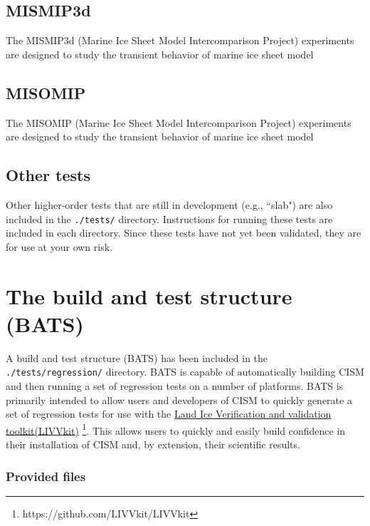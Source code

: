 \subsection{MISMIP3d}
\label{sc:mismip3d}
The MISMIP3d (Marine Ice Sheet Model Intercomparison Project) experiments \citep{Pattyn2013} are designed to study the transient behavior of marine ice sheet model 


\subsection{MISOMIP}
\label{sc:misomip}
The MISOMIP (Marine Ice Sheet Model Intercomparison Project) experiments \citep{AsayDavis2016} are designed to study the transient behavior of marine ice sheet model 


\subsection{Other tests}
Other higher-order tests that are still in development (e.g., ``slab") are also included in the \texttt{./tests/}
directory. Instructions for running these tests are included in each directory. Since these tests have not yet been validated, 
they are for use at your own risk.

\section{The build and test structure (BATS)}
\label{sc:bats}
A build and test structure (BATS) has been included in the \texttt{./tests/regression/} directory. BATS is capable of
automatically building CISM and then running a set of regression tests on a number of platforms. BATS is primarily
intended to allow users and developers of CISM to quickly generate a set of regression tests for use with the
\href{https://github.com/LIVVkit/LIVVkit}{Land Ice Verification and validation toolkit(LIVVkit)}
\footnote{https://github.com/LIVVkit/LIVVkit}. This allows users to quickly and easily build
confidence in their installation of CISM and, by extension, their scientific results. 

\subsubsection{Provided files}

